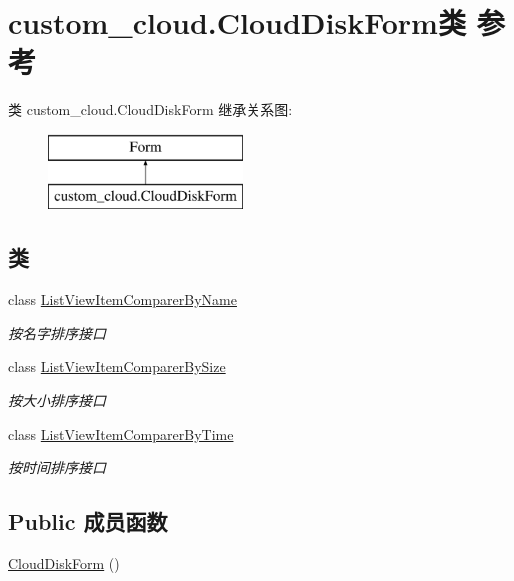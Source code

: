 \hypertarget{classcustom__cloud_1_1_cloud_disk_form}{}\section{custom\+\_\+cloud.\+Cloud\+Disk\+Form类 参考}
\label{classcustom__cloud_1_1_cloud_disk_form}
类 custom\+\_\+cloud.\+Cloud\+Disk\+Form 继承关系图\+:\begin{figure}[H]
\begin{center}
\leavevmode
\includegraphics[height=2.000000cm]{classcustom__cloud_1_1_cloud_disk_form}
\end{center}
\end{figure}
\subsection*{类}
\begin{DoxyCompactItemize}
\item 
class \hyperlink{classcustom__cloud_1_1_cloud_disk_form_1_1_list_view_item_comparer_by_name}{List\+View\+Item\+Comparer\+By\+Name}
\begin{DoxyCompactList}\small\item\em 按名字排序接口 \end{DoxyCompactList}\item 
class \hyperlink{classcustom__cloud_1_1_cloud_disk_form_1_1_list_view_item_comparer_by_size}{List\+View\+Item\+Comparer\+By\+Size}
\begin{DoxyCompactList}\small\item\em 按大小排序接口 \end{DoxyCompactList}\item 
class \hyperlink{classcustom__cloud_1_1_cloud_disk_form_1_1_list_view_item_comparer_by_time}{List\+View\+Item\+Comparer\+By\+Time}
\begin{DoxyCompactList}\small\item\em 按时间排序接口 \end{DoxyCompactList}\end{DoxyCompactItemize}
\subsection*{Public 成员函数}
\begin{DoxyCompactItemize}
\item 
\hyperlink{classcustom__cloud_1_1_cloud_disk_form_a5154aed056dae35ea049094c4aa3d966}{Cloud\+Disk\+Form} ()
\end{DoxyCompactItemize}
